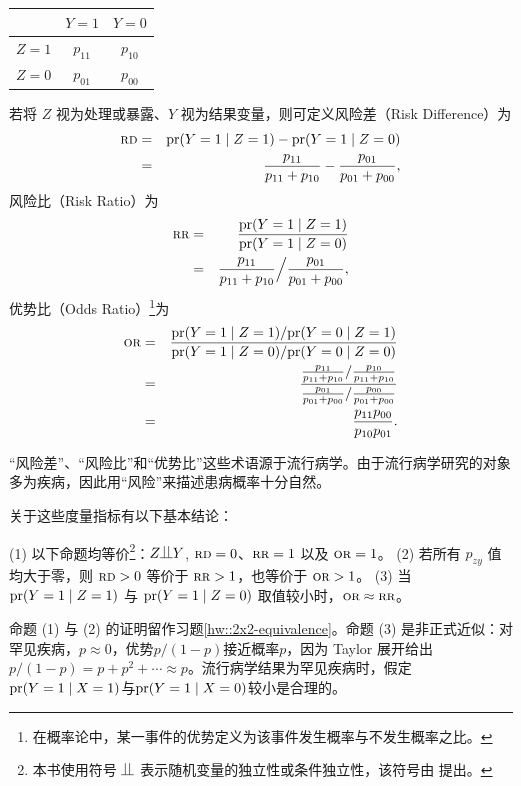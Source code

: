  
 \begin{center}
\begin{tabular}{lcc}
\hline 
        & $Y =1$ & $Y =0$\\\hline
$Z =1$ & $p_{11}$ & $p_{10}$\\ 
$Z =0$ & $p_{01}$ & $p_{00}$\\ 
\hline 
\end{tabular}
\end{center}
 
 
 若将 $Z$ 视为处理或暴露、$Y$ 视为结果变量，则可定义风险差（Risk Difference）为
\begin{eqnarray*}
\textsc{rd}  &=& \textup{pr}(Y=1\mid Z=1) - \textup{pr}(Y=1\mid Z=0)  \\
&=& \frac{p_{11}}{ p_{11} + p_{10} } -  \frac{p_{01}}{ p_{01} + p_{00} } ,
\end{eqnarray*}
风险比（Risk Ratio）为
\begin{eqnarray*}
 \textsc{rr} &=&  \frac{ \textup{pr}(Y=1\mid Z=1)  }{    \textup{pr}(Y=1\mid Z=0)    }  \\
& =&   \frac{p_{11}}{ p_{11} + p_{10} }  \Big /  \frac{p_{01}}{ p_{01} + p_{00} } ,
\end{eqnarray*}
优势比（Odds Ratio）\footnote{在概率论中，某一事件的优势定义为该事件发生概率与不发生概率之比。}为
\begin{eqnarray*}
 \textsc{or} &=& \frac{ \textup{pr}(Y=1\mid Z=1) /  \textup{pr}(Y=0\mid Z=1)  }{    \textup{pr}(Y=1\mid Z=0) /\textup{pr}(Y=0\mid Z=0)   }  \\
& =& \frac{      \frac{p_{11}}{ p_{11} + p_{10} } /  \frac{p_{10}}{ p_{11} + p_{10} }  }{  \frac{p_{01}}{ p_{01} + p_{00} } / \frac{p_{00}}{ p_{01} + p_{00} }     }  \\
 &=& \frac{ p_{11} p_{00}  }{  p_{10} p_{01} }.
\end{eqnarray*}

“风险差”、“风险比”和“优势比”这些术语源于流行病学。由于流行病学研究的对象多为疾病，因此用“风险”来描述患病概率十分自然。 
 
 
关于这些度量指标有以下基本结论：
\begin{proposition}\label{prop::2x2-independence}
(1) 以下命题均等价\footnote{本书使用符号 $\ind$ 表示随机变量的独立性或条件独立性，该符号由 \citet{dawid1979conditional} 提出。}：$Z\ind Y $, $\textsc{rd} = 0$、$\textsc{rr} = 1$ 以及 $\textsc{or} = 1$。 
(2) 若所有 $p_{zy}$ 值均大于零，则 $\textsc{rd} >0$ 等价于 $\textsc{rr} >1$，也等价于 $\textsc{or} > 1$。 
(3)
当 $\textup{pr}(Y=1\mid Z=1)$ 与 $ \textup{pr}(Y=1\mid Z=0)$ 取值较小时，$\textsc{or} \approx \textsc{rr}$。 
\end{proposition}

命题 (1) 与 (2) 的证明留作习题\ref{hw::2x2-equivalence}。命题 (3) 是非正式近似：对罕见疾病，$p\approx 0$，优势$p/(1-p)$接近概率$p$，因为 Taylor 展开给出$p/(1-p) = p + p^2 + \cdots\approx p $。流行病学结果为罕见疾病时，假定$\textup{pr}(Y=1\mid X=1)$与$ \textup{pr}(Y=1\mid X=0)$较小是合理的。
 

